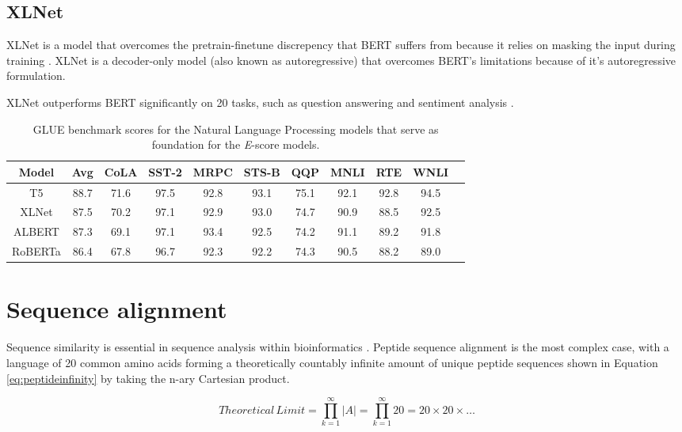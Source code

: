 \subsection{XLNet}
XLNet is a model that overcomes the pretrain-finetune discrepency that \gls{BERT} suffers from because it relies on masking the input during training \cite{Yang:2022}. XLNet is a decoder-only model (also known as autoregressive) that overcomes BERT's limitations because of it's autoregressive formulation.

XLNet outperforms \gls{BERT} significantly on 20 tasks, such as question answering and sentiment analysis \cite{Yang:2022}.

\begin{table} %
	\caption{GLUE benchmark scores \cite{Wang:2019} for the Natural Language Processing models that serve as foundation for the \textit{E}-score models.}
	\centering
    \vspace{1mm}
	\begin{tabular}{ |c|c|c|c|c|c|c|c|c|c|c| }
		\toprule
		Model & Avg & CoLA & SST-2 & MRPC & STS-B & QQP & MNLI & RTE & WNLI\\
		\midrule
		T5 & 88.7 & 71.6 & 97.5 & 92.8 & 93.1 & 75.1 & 92.1 & 92.8 & 94.5 \\
        XLNet & 87.5 & 70.2 & 97.1 & 92.9 & 93.0 & 74.7 & 90.9 & 88.5 & 92.5\\
		ALBERT & 87.3 & 69.1 & 97.1 & 93.4 & 92.5 & 74.2 & 91.1 & 89.2 & 91.8\\
        RoBERTa & 86.4 & 67.8 & 96.7 & 92.3 & 92.2 & 74.3 & 90.5 & 88.2 & 89.0 \\
		\bottomrule
	\end{tabular}
	\label{tab:glue}
\end{table}

\section{Sequence alignment}
Sequence similarity is essential in sequence analysis within bioinformatics \cite{Ofer:2021}. Peptide sequence alignment is the most complex case, with a language of 20 common \gls{amino acids} forming a theoretically countably infinite amount of unique \gls{peptide} sequences shown in Equation \ref{eq:peptideinfinity} by taking the n-ary Cartesian product.

\begin{equation}
    {Theoretical\, Limit} = \prod_{k=1}^{\infty} |A| = \prod_{k=1}^{\infty} 20 = 20 \times 20 \times \ldots
    \label{eq:peptideinfinity}
\end{equation}

